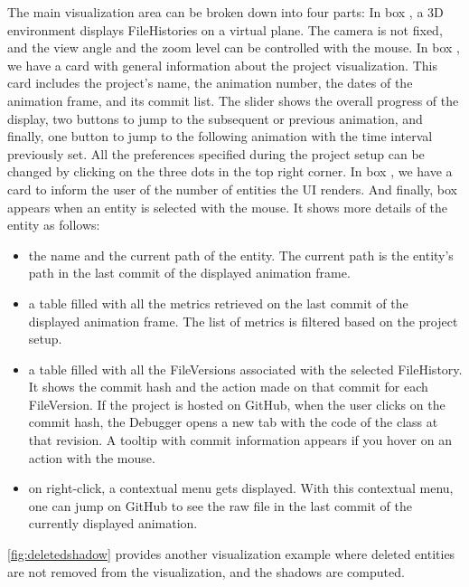 The main visualization area can be broken down into four parts: 
In box , a 3D environment displays FileHistories on a virtual plane. The camera is not fixed, and the view angle and the zoom level can be controlled with the mouse. 
In box , we have a card with general information about the project visualization. 
This card includes the project's name, the animation number, the dates of the animation frame, and its commit list. The slider shows the overall progress of the display, two buttons to jump to the subsequent or previous animation, and finally, one button to jump to the following animation with the time interval previously set. 
All the preferences specified during the project setup can be changed by clicking on the three dots in the top right corner.
In box , we have a card to inform the user of the number of entities the UI renders. 
And finally, box  appears when an entity is selected with the mouse. 
It shows more details of the entity as follows:
\begin{itemize}
    \item the name and the current path of the entity. The current path is the entity's path in the last commit of the displayed animation frame. 
    \item a table filled with all the metrics retrieved on the last commit of the displayed animation frame. The list of metrics is filtered based on the project setup. 
    \item a table filled with all the FileVersions associated with the selected FileHistory. It shows the commit hash and the action made on that commit for each FileVersion. If the project is hosted on GitHub, when the user clicks on the commit hash, the Debugger opens a new tab with the code of the class at that revision. A tooltip with commit information appears if you hover on an action with the mouse. 
    \item on right-click, a contextual menu gets displayed. With this contextual menu, one can jump on GitHub to see the raw file in the last commit of the currently displayed animation. 
\end{itemize}

\autoref{fig:deletedshadow} provides another visualization example where deleted entities are not removed from the visualization, and the shadows are computed. 

